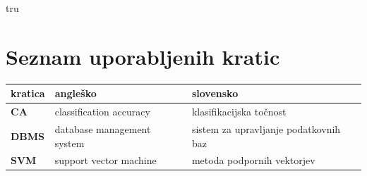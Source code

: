 \documentclass[a4paper, 12pt]{book}
\def\onlycontent{tru} %
\newcommand{\clearemptydoublepage}{\newpage{\pagestyle{empty}\cleardoublepage}}
\theoremstyle{definition}
\begin{document}
\clearemptydoublepage

\pagestyle{empty}
\fi
\def\thepage{}%
\tableofcontents{}
\ifx\onlycontent\undefined


\clearemptydoublepage


\chapter*{Seznam uporabljenih kratic}  %

\noindent\begin{tabular}{p{}|p{}|p{}}    %
  {\bf kratica} & {\bf angleško}                             & {\bf slovensko} \\ \hline
  {\bf CA}      & classification accuracy               & klasifikacijska točnost \\
  {\bf DBMS} & database management system & sistem za upravljanje podatkovnih baz \\
  {\bf SVM}   & support vector machine              & metoda podpornih vektorjev \\
\end{tabular}


\clearemptydoublepage

\end{document}
